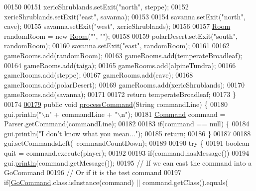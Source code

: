 \begin{DoxyCode}
00150 
00151         xericShrublands.setExit(\textcolor{stringliteral}{"north"}, steppe);
00152         xericShrublands.setExit(\textcolor{stringliteral}{"east"}, savanna);
00153 
00154         savanna.setExit(\textcolor{stringliteral}{"north"}, cave);
00155         savanna.setExit(\textcolor{stringliteral}{"west"}, xericShrublands);
00156 
00157         \hyperlink{classpkg__world_1_1Room}{Room} randomRoom = \textcolor{keyword}{new} \hyperlink{classpkg__world_1_1Room}{Room}(\textcolor{stringliteral}{""}, \textcolor{stringliteral}{""});
00158 
00159         polarDesert.setExit(\textcolor{stringliteral}{"south"}, randomRoom);
00160         savanna.setExit(\textcolor{stringliteral}{"east"}, randomRoom);
00161 
00162         gameRooms.add(randomRoom);
00163         gameRooms.add(temperateBroadleaf);
00164         gameRooms.add(taiga);
00165         gameRooms.add(alpineTundra);
00166         gameRooms.add(steppe);
00167         gameRooms.add(cave);
00168         gameRooms.add(polarDesert);
00169         gameRooms.add(xericShrublands);
00170         gameRooms.add(savanna);
00171 
00172         \textcolor{keywordflow}{return} temperateBroadleaf;
00173     \}
00174 
\hypertarget{GameEngine_8java_source_l00179}{}\hyperlink{classGameEngine_ad7133885f313fa99bca3bb7cb8272f64}{00179}     \textcolor{keyword}{public} \textcolor{keywordtype}{void} \hyperlink{classGameEngine_ad7133885f313fa99bca3bb7cb8272f64}{processCommand}(String commandLine) \{
00180         gui.println(\textcolor{stringliteral}{"\(\backslash\)n"} + commandLine + \textcolor{stringliteral}{"\(\backslash\)n"});
00181         \hyperlink{classpkg__commands_1_1Command}{Command} command = Parser.getCommand(commandLine);
00182 
00183         \textcolor{keywordflow}{if}(command == null) \{
00184             gui.println(\textcolor{stringliteral}{"I don't know what you mean..."});
00185             \textcolor{keywordflow}{return};
00186         \}
00187 
00188         gui.setCommandsLeft(--commandCountDown);
00189 
00190         \textcolor{keywordflow}{try} \{
00191             \textcolor{keywordtype}{boolean} quit = command.execute(player);
00192 
00193             \textcolor{keywordflow}{if}(command.hasMessage())
00194                 gui.\hyperlink{classUserInterface_a79f606b4b1f5d1523e50eea00039ed94}{println}(command.getMessage());
00195             \textcolor{comment}{// If we can cast the command into a GoCommand}
00196             \textcolor{comment}{// Or if it is the test command}
00197             \textcolor{keywordflow}{if}(\hyperlink{classpkg__commands_1_1GoCommand}{GoCommand}.class.isInstance(command) || command.getClass().equals(

\end{DoxyCode}
